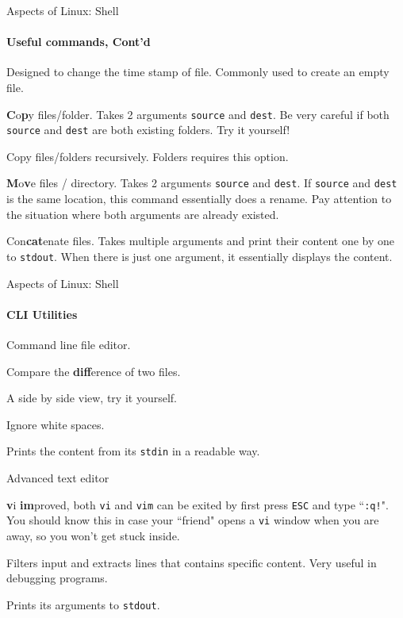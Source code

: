 \begin{frame}{Aspects of Linux: Shell}
\framesubtitle{Useful commands, Cont'd}
\begin{description}[mkdir]
	\item[touch] Designed to change the time stamp of file. Commonly used to create an empty file.
	\item[cp] \textbf{C}o\textbf{p}y files/folder. Takes 2 arguments \texttt{source} and \texttt{dest}. Be very careful if both \texttt{source} and \texttt{dest} are both existing folders. Try it yourself!
	\begin{description}[-]
		\small
		\item[-r] Copy files/folders recursively. Folders requires this option.  
	\end{description}
	\item[mv] \textbf{M}o\textbf{v}e files / directory. Takes 2 arguments \texttt{source} and \texttt{dest}. If \texttt{source} and \texttt{dest} is the same location, this command essentially does a rename. Pay attention to the situation where both arguments are already existed.
	\item[cat]<2-> Con\textbf{cat}enate files. Takes multiple arguments and print their content one by one to \texttt{stdout}. When there is just one argument, it essentially displays the content.
\end{description}
\end{frame}

\begin{frame}{Aspects of Linux: Shell}
\framesubtitle{CLI Utilities}
\begin{description}[vi/vim]
	\item[nano] Command line file editor.
	\item[diff] Compare the \textbf{diff}erence of two files. 
	\begin{description}[-]
		\small
		\item[-y] A side by side view, try it yourself.
		\item[-w] Ignore white spaces.  
	\end{description}
	\item[less] Prints the content from its \texttt{stdin} in a readable way.
	\item[vi] Advanced text editor
	\item[vim] \textbf{v}i \textbf{im}proved, both \texttt{vi} and \texttt{vim} can be exited by first press \texttt{ESC} and type ``\texttt{:q!}". You should know this in case your ``friend" opens a \texttt{vi} window when you are away, so you won't get stuck inside.
	\item[grep] Filters input and extracts lines that contains specific content. Very useful in debugging programs. 
	\item[echo] Prints its arguments to \texttt{stdout}.
\end{description}

\end{frame}

